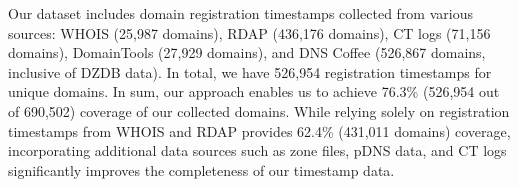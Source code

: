 Our dataset includes domain registration timestamps collected from various sources: WHOIS (25,987 domains), RDAP (436,176 domains), CT logs (71,156 domains), DomainTools (27,929 domains), and DNS Coffee (526,867 domains, inclusive of DZDB data).
In total, we have 526,954 registration timestamps for unique domains. 
% 
% 
In sum, our approach enables us to achieve 76.3\% (526,954 out of 690,502) coverage of our collected domains. While relying solely on registration timestamps from WHOIS and RDAP provides 62.4\% (431,011 domains) coverage, incorporating additional data sources such as zone files, pDNS data, and CT logs significantly improves the completeness of our timestamp data.


